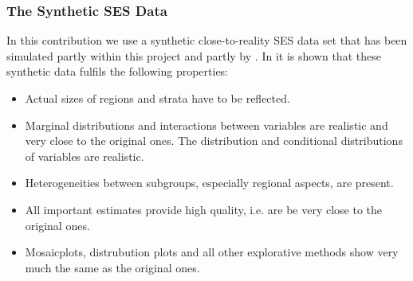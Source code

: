 \documentclass[12pt]{article}
\begin{document}



\subsubsection{The Synthetic SES Data}
In this contribution we use a synthetic close-to-reality SES data set that has
been simulated partly within this project and partly by \cite{geissler12}.
In \cite{geissler12} it is shown that these synthetic data fulfils the following properties:
\begin{itemize}
  \item Actual sizes of regions and strata have to be reflected.
  \item Marginal distributions and interactions between variables are 
  realistic and very close to the original ones. The distribution and conditional distributions of variables are realistic.
 \item Heterogeneities between subgroups, especially regional aspects, are 
present.
\item All important estimates provide high quality, i.e. are be very close to the original ones.
\item Mosaicplots, distrubution plots and all other explorative methods show very much the same as the original ones.
\end{itemize}
\end{document}
